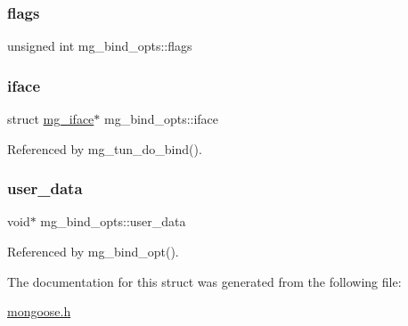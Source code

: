 \mbox{\label{structmg__bind__opts_ae257fe726a23692a36fb8c92885d4873_ae257fe726a23692a36fb8c92885d4873}} 
\subsubsection{\texorpdfstring{flags}{flags}}
{\footnotesize\ttfamily unsigned int mg\+\_\+bind\+\_\+opts\+::flags}

\mbox{\label{structmg__bind__opts_a328924ea266e19c9add95902d82271ad_a328924ea266e19c9add95902d82271ad}} 
\subsubsection{\texorpdfstring{iface}{iface}}
{\footnotesize\ttfamily struct \hyperlink{structmg__iface}{mg\+\_\+iface}$\ast$ mg\+\_\+bind\+\_\+opts\+::iface}



Referenced by mg\+\_\+tun\+\_\+do\+\_\+bind().

\mbox{\label{structmg__bind__opts_a3bd493ef5bd6c8da605b1480a6c189c4_a3bd493ef5bd6c8da605b1480a6c189c4}} 
\subsubsection{\texorpdfstring{user\+\_\+data}{user\_data}}
{\footnotesize\ttfamily void$\ast$ mg\+\_\+bind\+\_\+opts\+::user\+\_\+data}



Referenced by mg\+\_\+bind\+\_\+opt().



The documentation for this struct was generated from the following file\+:\begin{DoxyCompactItemize}
\item 
\hyperlink{mongoose_8h}{mongoose.\+h}\end{DoxyCompactItemize}
